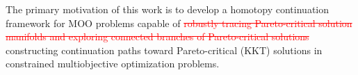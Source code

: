 \documentclass[11pt,pdflatex,sn-mathphys-ay]{sn-jnl}%
\theoremstyle{definition}
\theoremstyle{thmstyleone}%
\theoremstyle{thmstyletwo}%
\theoremstyle{thmstylethree}%
\newcommand{\del}[1]{\textcolor{red}{\sout{#1}}}
\newcommand{\add}[1]{\textcolor{revisionblue}{#1}}
\begin{document}
	
	The primary motivation of this work is to develop a homotopy continuation
	framework for MOO problems capable of
	\del{robustly tracing Pareto-critical solution manifolds and exploring
		connected branches of Pareto-critical solutions}
	\add{constructing continuation paths toward Pareto-critical (KKT)
		solutions}
	in constrained multiobjective optimization problems.
	
\end{document}
